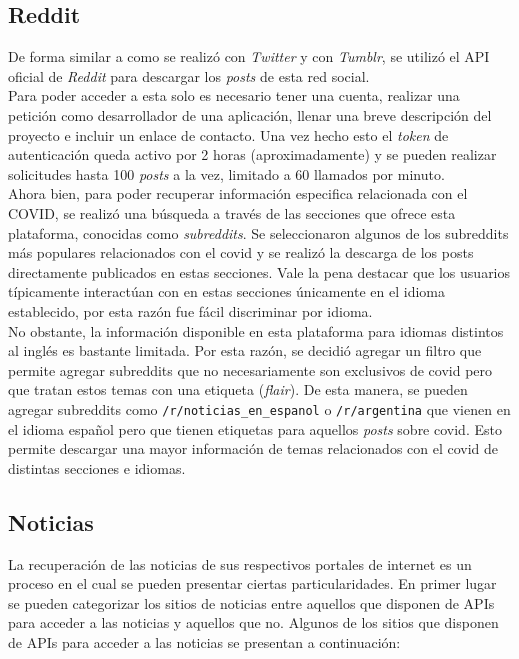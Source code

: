 \subsection{Reddit}

De forma similar a como se realizó con \textit{Twitter} y con \textit{Tumblr}, se utilizó el API oficial de \textit{Reddit} \cite{RedditDoc} para descargar los \textit{posts} de esta red social. \\

Para poder acceder a esta solo es necesario tener una cuenta, realizar una petición como desarrollador de una aplicación, llenar una breve descripción del proyecto e incluir un enlace de contacto. Una vez hecho esto el \textit{token} de autenticación queda activo por 2 horas (aproximadamente) y se pueden realizar solicitudes hasta 100 \textit{posts} a la vez, limitado a 60 llamados por minuto. \\

Ahora bien, para poder recuperar información especifica relacionada con el COVID, se realizó una búsqueda a través de las secciones que ofrece esta plataforma, conocidas como \textit{subreddits}. Se seleccionaron algunos de los subreddits más populares relacionados con el covid y se realizó la descarga de los posts directamente publicados en estas secciones. Vale la pena destacar que los usuarios típicamente interactúan con en estas secciones únicamente en el idioma establecido, por esta razón fue fácil discriminar por idioma.\\

No obstante, la información disponible en esta plataforma para idiomas distintos al inglés es bastante limitada. Por esta razón, se decidió agregar un filtro que permite agregar subreddits que no necesariamente son exclusivos de covid pero que tratan estos temas con una etiqueta (\textit{flair}). De esta manera, se pueden agregar subreddits como \texttt{/r/noticias\_en\_espanol} o \texttt{/r/argentina} que vienen en el idioma español pero que tienen etiquetas para aquellos \textit{posts} sobre covid. Esto permite descargar una mayor información de temas relacionados con el covid de distintas secciones e idiomas.

\subsection{Noticias}
La recuperación de las noticias de sus respectivos portales de internet es un proceso en el cual se pueden presentar ciertas particularidades. En primer lugar se pueden categorizar los sitios de noticias entre aquellos que disponen de APIs para acceder a las noticias y aquellos que no. Algunos de los sitios que disponen de APIs para acceder a las noticias se presentan a continuación:

